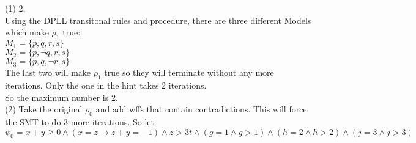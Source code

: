 \documentclass[11pt,leqno,fleqn]{article}
\begin{document}
\section{}
(1) 2, \\
Using the DPLL transitonal rules and procedure, there are three different Models which make $\rho_1$ true:\\
$M_1 = \{p,q,r,s\}$\\
$M_2 = \{p,\neg q,r,s\}$\\
$M_3 = \{p,q,\neg r,s\}$\\
The last two will make $\rho_1$ true so they will terminate without any more iterations. Only the one in the hint takes 2 iterations.\\
So the maximum number is 2.
\\
(2)
Take the original $\rho_0$ and add wffs that contain contradictions. This will force the SMT to do 3 more iterations.
So let\\
 $\psi_0 = x + y \geq 0 \land (x = z \to z+y = -1) \land z>3t \land (g = 1 \land g > 1) \land (h = 2 \land h >2) \land (j = 3 \land j > 3) $\\
\end{document}
